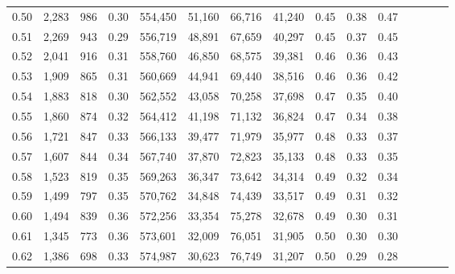 \begin{tabular}{rrrcrrrrrrrrrrr}
0.50 &   2,283 &     986 &                                       0.30 &  554,450 &   51,160 &   66,716 &   41,240 &  0.45 &  0.38 &                         0.47 \\
0.51 &   2,269 &     943 &                                       0.29 &  556,719 &   48,891 &   67,659 &   40,297 &  0.45 &  0.37 &                         0.45 \\
0.52 &   2,041 &     916 &                                       0.31 &  558,760 &   46,850 &   68,575 &   39,381 &  0.46 &  0.36 &                         0.43 \\
0.53 &   1,909 &     865 &                                       0.31 &  560,669 &   44,941 &   69,440 &   38,516 &  0.46 &  0.36 &                         0.42 \\
0.54 &   1,883 &     818 &                                       0.30 &  562,552 &   43,058 &   70,258 &   37,698 &  0.47 &  0.35 &                         0.40 \\
0.55 &   1,860 &     874 &                                       0.32 &  564,412 &   41,198 &   71,132 &   36,824 &  0.47 &  0.34 &                         0.38 \\
0.56 &   1,721 &     847 &                                       0.33 &  566,133 &   39,477 &   71,979 &   35,977 &  0.48 &  0.33 &                         0.37 \\
0.57 &   1,607 &     844 &                                       0.34 &  567,740 &   37,870 &   72,823 &   35,133 &  0.48 &  0.33 &                         0.35 \\
0.58 &   1,523 &     819 &                                       0.35 &  569,263 &   36,347 &   73,642 &   34,314 &  0.49 &  0.32 &                         0.34 \\
0.59 &   1,499 &     797 &                                       0.35 &  570,762 &   34,848 &   74,439 &   33,517 &  0.49 &  0.31 &                         0.32 \\
0.60 &   1,494 &     839 &                                       0.36 &  572,256 &   33,354 &   75,278 &   32,678 &  0.49 &  0.30 &                         0.31 \\
0.61 &   1,345 &     773 &                                       0.36 &  573,601 &   32,009 &   76,051 &   31,905 &  0.50 &  0.30 &                         0.30 \\
0.62 &   1,386 &     698 &                                       0.33 &  574,987 &   30,623 &   76,749 &   31,207 &  0.50 &  0.29 &                         0.28 \\

\end{tabular}
